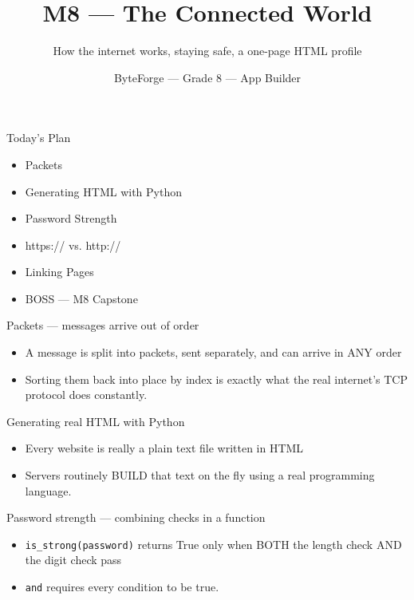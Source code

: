 \documentclass[aspectratio=169]{beamer}
\title{M8 — The Connected World}
\subtitle{How the internet works, staying safe, a one-page HTML profile}
\author{ByteForge --- Grade 8 --- App Builder}
\date{}
\begin{document}
\begin{frame}
    \titlepage
\end{frame}

\begin{frame}{Today's Plan}
    \begin{itemize}
        \item Packets
        \item Generating HTML with Python
        \item Password Strength
        \item https:// vs. http://
        \item Linking Pages
        \item[$\bigstar$] BOSS --- M8 Capstone
    \end{itemize}
\end{frame}

\begin{frame}{Packets — messages arrive out of order}
    \large
    \begin{itemize}
        \item A message is split into packets, sent separately, and can arrive in ANY order
        \item Sorting them back into place by index is exactly what the real internet's TCP protocol does constantly.
    \end{itemize}
\end{frame}


\begin{frame}{Generating real HTML with Python}
    \large
    \begin{itemize}
        \item Every website is really a plain text file written in HTML
        \item Servers routinely BUILD that text on the fly using a real programming language.
    \end{itemize}
\end{frame}


\begin{frame}{Password strength — combining checks in a function}
    \large
    \begin{itemize}
        \item \texttt{is\_strong(password)} returns True only when BOTH the length check AND the digit check pass
        \item \texttt{and} requires every condition to be true.
    \end{itemize}
\end{frame}
\end{document}
